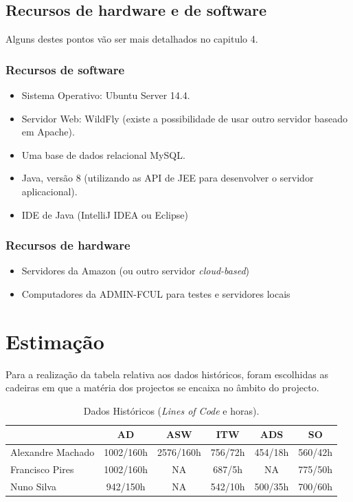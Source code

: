 \documentclass[12pt, a4paper, twoside]{report} %
\begin{document}
\clearpage

\subsection{Recursos de hardware e de software}

Alguns destes pontos vão ser mais detalhados no capitulo 4.

\subsubsection{Recursos de software}

\begin{itemize}
\item Sistema Operativo: Ubuntu Server 14.4.
\item Servidor Web: WildFly (existe a possibilidade de usar outro servidor baseado em Apache).
\item Uma base de dados relacional MySQL.
\item Java, versão 8 (utilizando as API de JEE para desenvolver o servidor aplicacional).
\item IDE de Java (IntelliJ IDEA ou Eclipse)
\end{itemize}

\subsubsection{Recursos de hardware}
\begin{itemize}
\item Servidores da Amazon (ou outro servidor \textit{cloud-based}) 
\item Computadores da ADMIN-FCUL para testes e servidores locais
\end{itemize}

\clearpage


\section{Estimação}

Para a realização da tabela relativa aos dados históricos, foram escolhidas as cadeiras em que a matéria dos projectos se encaixa no âmbito do projecto.

\begin{table}[h]
\centering
\begin{tabular}{|l|c c c c c|}
\hline
				  & AD        & ASW       & ITW     & ADS     & SO      \\ \hline
Alexandre Machado & 1002/160h & 2576/160h & 756/72h & 454/18h & 560/42h \\ \hline
Francisco Pires   & 1002/160h & NA        & 687/5h  & NA      & 775/50h \\ \hline
Nuno Silva        & 942/150h  & NA        & 542/10h & 500/35h & 700/60h\\ \hline
\end{tabular}
\caption{ Dados Históricos (\textit{Lines of Code} e horas).}
\label{my-label}
\end{table}
\end{document}
